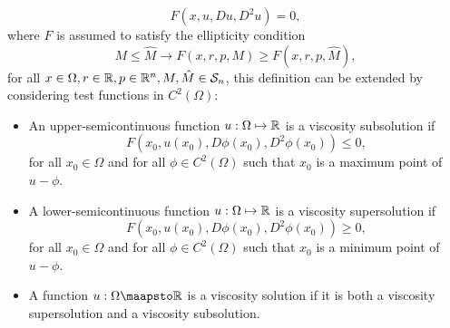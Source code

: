 \begin{equation}
    F(x, u, D u, D^2 u) = 0,
\end{equation}
where $F$ is assumed to satisfy the ellipticity condition
\begin{equation}
    M \leq \hat M \rightarrow F(x,r,p,M) \geq F(x,r,p,\hat M),
\end{equation}
for all $x \in \Omega, r \in \mathbb{R}, p \in \mathbb{R}^n, M,\hat M \in \mathcal{S}_n$,
this definition can be extended by considering test functions in $C^2(\Omega)$:
\begin{definition}
    \begin{itemize}
        \item An upper-semicontinuous function $u : \Omega \mapsto \mathbb{R}$ is a viscosity subsolution if
    \begin{equation*}
        F(x_0, u(x_0), D \phi(x_0), D^2 \phi(x_0)) \leq 0,
    \end{equation*}
    for all $x_0 \in \Omega$ and for all $\phi \in C^2(\Omega)$ such that $x_0$ is a maximum point of $u - \phi$.
        \item A lower-semicontinuous function $u : \Omega \mapsto \mathbb{R}$ is a viscosity supersolution if
    \begin{equation*}
        F(x_0, u(x_0), D\phi(x_0), D^2 \phi(x_0)) \geq 0,
    \end{equation*}
    for all $x_0 \in \Omega$ and for all $\phi \in C^2(\Omega)$ such that $x_0$ is a minimum point of $u - \phi$.
        \item A function $u : \Omega \maapsto \RR$ is a viscosity solution if it is both
        a viscosity supersolution and a viscosity subsolution.
    \end{itemize}
\end{definition}